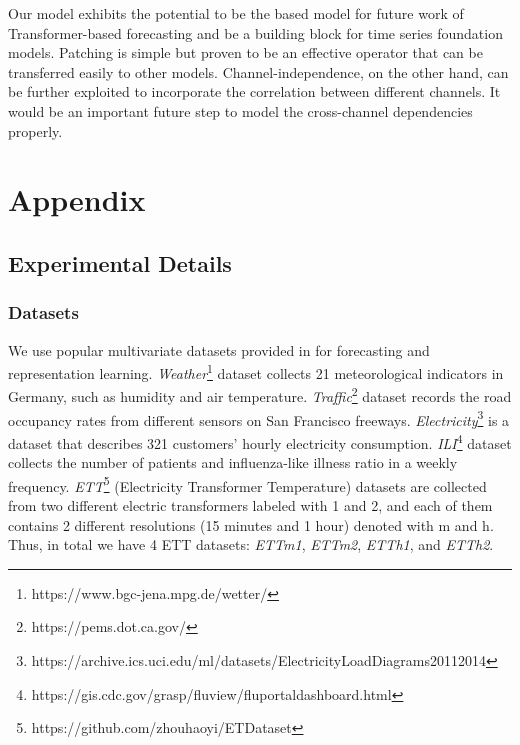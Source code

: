 \documentclass{article} \usepackage{iclr2023_conference,times}
\begin{document}
Our model exhibits the potential to be the based model for future work of Transformer-based forecasting and be a building block for time series foundation models. Patching is simple but proven to be an effective operator that can be transferred easily to other models. Channel-independence, on the other hand, can be further exploited to incorporate the correlation between different channels. It would be an important future step to model the cross-channel dependencies properly.






\newpage 
\appendix
\section{Appendix}


\subsection{Experimental Details}
\label{append:exp}

\subsubsection{Datasets}

We use  popular multivariate datasets provided in \citep{autoformer} for forecasting and representation learning. \textit{Weather}\footnote{https://www.bgc-jena.mpg.de/wetter/} dataset collects 21 meteorological indicators in Germany, such as humidity and air temperature. \textit{Traffic}\footnote{https://pems.dot.ca.gov/} dataset records the road occupancy rates from different sensors on San Francisco freeways. \textit{Electricity}\footnote{https://archive.ics.uci.edu/ml/datasets/ElectricityLoadDiagrams20112014} is a dataset that describes 321 customers' hourly electricity consumption. \textit{ILI}\footnote{https://gis.cdc.gov/grasp/fluview/fluportaldashboard.html} dataset collects the number of patients and influenza-like illness ratio in a weekly frequency. \textit{ETT}\footnote{https://github.com/zhouhaoyi/ETDataset} (Electricity Transformer Temperature) datasets are collected from two different electric transformers labeled with 1 and 2, and each of them contains 2 different resolutions (15 minutes and 1 hour) denoted with m and h. Thus, in total we have 4 ETT datasets: \textit{ETTm1}, \textit{ETTm2}, \textit{ETTh1}, and \textit{ETTh2}. 
\end{document}
